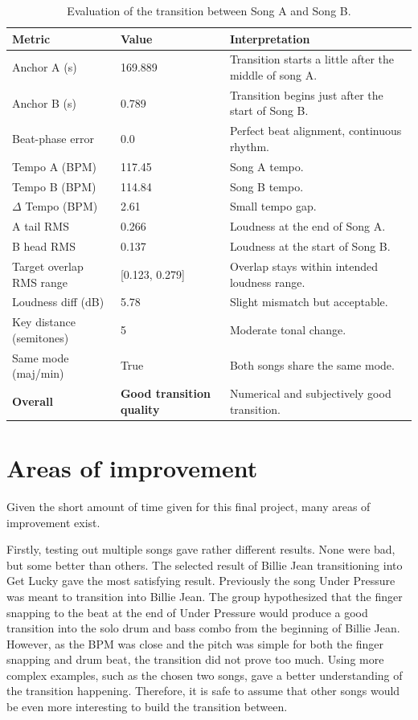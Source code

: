 \documentclass[14pt]{extarticle}
\begin{document}
\begin{table}[H]
\centering
\begin{tabular}{l l l}
\hline
\textbf{Metric} & \textbf{Value} & \textbf{Interpretation} \\
\hline
Anchor A (s) & 169.889 & Transition starts a little after the middle of song A. \\
Anchor B (s) & 0.789 & Transition begins just after the start of Song B. \\
Beat-phase error & 0.0 & Perfect beat alignment, continuous rhythm. \\
Tempo A (BPM) & 117.45 & Song A tempo. \\
Tempo B (BPM) & 114.84 & Song B tempo. \\
$\Delta$ Tempo (BPM) & 2.61 & Small tempo gap. \\
A tail RMS & 0.266 & Loudness at the end of Song A. \\
B head RMS & 0.137 & Loudness at the start of Song B. \\
Target overlap RMS range & [0.123, 0.279] & Overlap stays within intended loudness range. \\
Loudness diff (dB) & 5.78 & Slight mismatch but acceptable. \\
Key distance (semitones) & 5 & Moderate tonal change. \\
Same mode (maj/min) & True & Both songs share the same mode. \\
\hline
\textbf{Overall} & \textbf{Good transition quality} & Numerical and subjectively good transition. \\ 
\hline
\end{tabular}
\caption{Evaluation of the transition between Song A and Song B.}
\label{tab:evaluation}
\end{table}






\section{Areas of improvement}

Given the short amount of time given for this final project, many areas of improvement exist.

Firstly, testing out multiple songs gave rather different results. None were bad, but some better than others. The selected result of Billie Jean transitioning into Get Lucky gave the most satisfying result. Previously the song Under Pressure was meant to transition into Billie Jean. The group hypothesized that the finger snapping to the beat at the end of Under Pressure would produce a good transition into the solo drum and bass combo from the beginning of Billie Jean. However, as the BPM was close and the pitch was simple for  both the finger snapping and drum beat, the transition did not prove too much. Using more complex examples, such as the chosen two songs, gave a better understanding of the transition happening. Therefore, it is safe to assume that other songs would be even more interesting to build the transition between.
\end{document}
